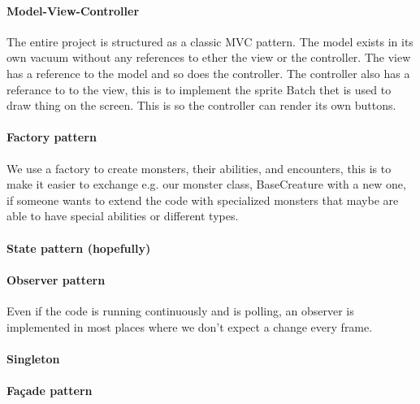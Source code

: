 \paragraph{Model-View-Controller\\}
The entire project is structured as a classic MVC pattern. The model exists in its own vacuum without any references to ether the view or the controller. The view has a reference to the model and so does the controller. The controller also has a referance to to the view, this is to implement the sprite Batch thet is used to draw thing on the screen. This is so the controller can render its own buttons.
\paragraph{Factory pattern\\}
We use a factory to create monsters, their abilities, and encounters, this is to make it easier to exchange e.g. our monster class, BaseCreature with a new one, if someone wants to extend the code with specialized monsters that maybe are able to have special abilities or different types.
\paragraph{State pattern (hopefully)\\}
\paragraph{Observer pattern\\}
Even if the code is running continuously and is polling, an observer is implemented in most places where we don't expect a change every frame.
\paragraph{Singleton\\}

\paragraph{Façade pattern\\}
